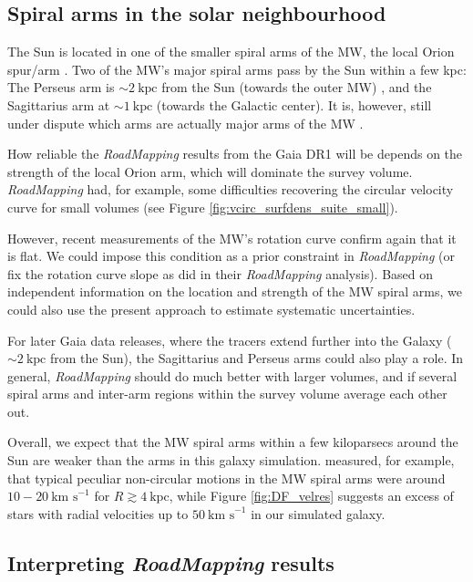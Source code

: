 \documentclass[iop,revtex4,numberedappendix,appendixfloats]{emulateapj}
\newcommand{\RM}{{\sl RoadMapping}}
\begin{document}
\subsection{Spiral arms in the solar neighbourhood} \label{sec:discussion_sun_location}

The Sun is located in one of the smaller spiral arms of the MW, the local Orion spur/arm \citep{1953ApJ...118..318M}. Two of the MW's major spiral arms pass by the Sun within a few kpc: The Perseus arm is $\sim2~\text{kpc}$ from the Sun (towards the outer MW) \citep{2006Sci...311...54X}, and the Sagittarius arm at $\sim1~\text{kpc}$ \citep{2010PASJ...62..287S} (towards the Galactic center). It is, however, still under dispute which arms are actually major arms of the MW \citep{1985IAUS..106..335B,2013ApJ...769...15X,2013ApJ...775...79Z}.

How reliable the \RM{} results from the Gaia DR1 will be depends on the strength of the local Orion arm, which will dominate the survey volume. \RM{} had, for example, some difficulties recovering the circular velocity curve for small volumes (see Figure \ref{fig:vcirc_surfdens_suite_small}).

However, recent measurements of the MW's rotation curve \citep{2012ApJ...759..131B,2014ApJ...783..130R} confirm again that it is flat. We could impose this condition as a prior constraint in \RM{} (or fix the rotation curve slope as \citet{2013ApJ...779..115B} did in their \RM{} analysis). Based on independent information on the location and strength of the MW spiral arms, we could also use the present approach to estimate systematic uncertainties.

For later Gaia data releases, where the tracers extend further into the Galaxy ($\sim2~\text{kpc}$ from the Sun), the Sagittarius and Perseus arms could also play a role. In general, \RM{} should do much better with larger volumes, and if several spiral arms and inter-arm regions within the survey volume average each other out.

Overall, we expect that the MW spiral arms within a few kiloparsecs around the Sun are weaker than the arms in this galaxy simulation. \citet{2014ApJ...783..130R} measured, for example, that typical peculiar non-circular motions in the MW spiral arms were around $10-20~\text{km s}^{-1}$ for $R \gtrsim 4~\text{kpc}$, while Figure \ref{fig:DF_velres} suggests an excess of stars with radial velocities up to $50~\text{km s}^{-1}$ in our simulated galaxy.

\subsection{Interpreting \RM{} results}
\end{document}
